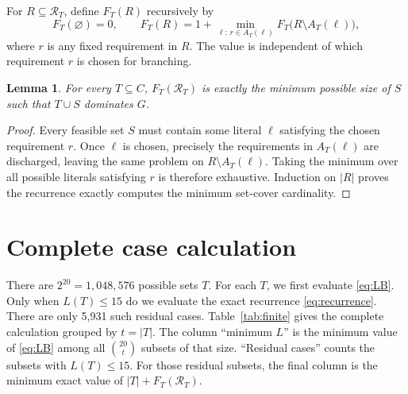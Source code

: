 \documentclass[11pt]{article}
\newtheorem{lemma}[theorem]{Lemma}
\theoremstyle{definition}
\theoremstyle{remark}
\begin{document}
For \(R\subseteq\mathcal R_T\), define \(F_T(R)\) recursively by
\begin{equation}\label{eq:recurrence}
F_T(\varnothing)=0,
\qquad
F_T(R)=1+\min_{\ell:\,r\in A_T(\ell)}F_T\bigl(R\setminus A_T(\ell)\bigr),
\end{equation}
where \(r\) is any fixed requirement in \(R\).  The value is independent of which requirement \(r\) is chosen for branching.

\begin{lemma}\label{lem:recurrence}
For every \(T\subseteq C\), \(F_T(\mathcal R_T)\) is exactly the minimum possible size of \(S\) such that \(T\cup S\) dominates \(G\).
\end{lemma}

\begin{proof}
Every feasible set \(S\) must contain some literal \(\ell\) satisfying the chosen requirement \(r\).  Once \(\ell\) is chosen, precisely the requirements in \(A_T(\ell)\) are discharged, leaving the same problem on \(R\setminus A_T(\ell)\).  Taking the minimum over all possible literals satisfying \(r\) is therefore exhaustive.  Induction on \(|R|\) proves the recurrence exactly computes the minimum set-cover cardinality.
\end{proof}

\section{Complete case calculation}\label{sec:table}
There are \(2^{20}=1,048,576\) possible sets \(T\).  For each \(T\), we first evaluate \eqref{eq:LB}.  Only when \(L(T)\le15\) do we evaluate the exact recurrence \eqref{eq:recurrence}.  There are only 5,931 such residual cases.  Table~\ref{tab:finite} gives the complete calculation grouped by \(t=|T|\).  The column ``minimum \(L\)'' is the minimum value of \eqref{eq:LB} among all \(\binom{20}{t}\) subsets of that size.  ``Residual cases'' counts the subsets with \(L(T)\le15\).  For those residual subsets, the final column is the minimum exact value of
\(|T|+F_T(\mathcal R_T)\).
\end{document}
